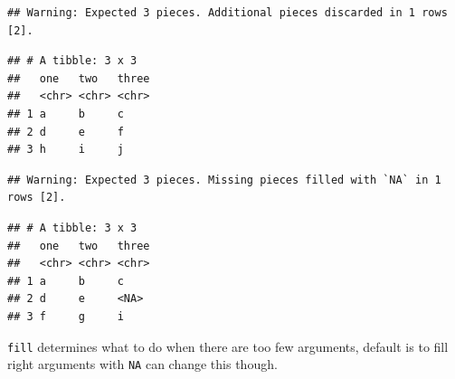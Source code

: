 \documentclass[]{book}
\newenvironment{Shaded}{\begin{snugshade}}{\end{snugshade}}
\newcommand{\DataTypeTok}[1]{\textcolor[rgb]{0.13,0.29,0.53}{#1}}
\newcommand{\KeywordTok}[1]{\textcolor[rgb]{0.13,0.29,0.53}{\textbf{#1}}}
\newcommand{\NormalTok}[1]{#1}
\newcommand{\OperatorTok}[1]{\textcolor[rgb]{0.81,0.36,0.00}{\textbf{#1}}}
\newcommand{\StringTok}[1]{\textcolor[rgb]{0.31,0.60,0.02}{#1}}
\theoremstyle{definition}
\theoremstyle{definition}
\theoremstyle{definition}
\theoremstyle{remark}
\begin{document}
\begin{verbatim}
## Warning: Expected 3 pieces. Additional pieces discarded in 1 rows [2].
\end{verbatim}

\begin{verbatim}
## # A tibble: 3 x 3
##   one   two   three
##   <chr> <chr> <chr>
## 1 a     b     c    
## 2 d     e     f    
## 3 h     i     j
\end{verbatim}

\begin{Shaded}
\end{Shaded}

\begin{verbatim}
## Warning: Expected 3 pieces. Missing pieces filled with `NA` in 1 rows [2].
\end{verbatim}

\begin{verbatim}
## # A tibble: 3 x 3
##   one   two   three
##   <chr> <chr> <chr>
## 1 a     b     c    
## 2 d     e     <NA> 
## 3 f     g     i
\end{verbatim}

\texttt{fill} determines what to do when there are too few arguments,
default is to fill right arguments with \texttt{NA} can change this
though.

\begin{Shaded}
\end{Shaded}
\end{document}
